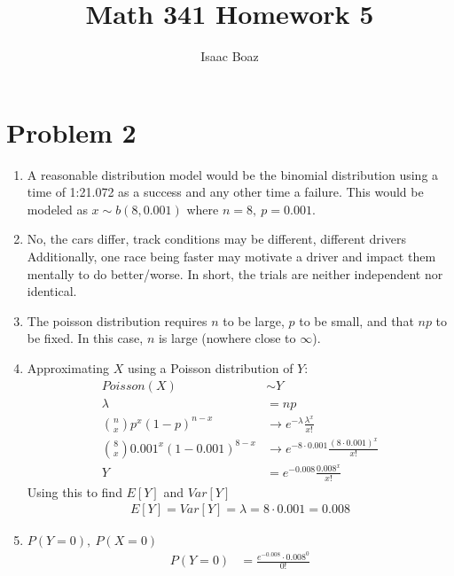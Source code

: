 \documentclass{article}
\title{\vspace{-4ex}Math 341 Homework 5}
\author{Isaac Boaz}
\begin{document}
\maketitle

\section*{Problem 2}
\begin{enumerate}[label=\alph*)]
    \item A reasonable distribution model would be the binomial distribution using a time of 1:21.072 as a success and any other time a failure. This would be modeled as \(x \sim b(8, 0.001)\) where \(n = 8,\ p = 0.001\).
    \item No, the cars differ, track conditions may be different, different drivers
          Additionally, one race being faster may motivate a driver and impact them mentally to do better/worse. In short, the trials are neither independent nor identical.
    \item The poisson distribution requires \(n\) to be large, \(p\) to be small, and that \(np\) to be fixed. In this case, \(n\) is large (nowhere close to \(\infty\)).
    \item Approximating \(X\) using a Poisson distribution of \(Y\):
          \begin{align*}
              Poisson(X)                         & \sim Y                                                 \\
              \lambda                            & = np                                                   \\
              \binom{n}{x}p^x(1-p)^{n-x}         & \rightarrow e^{-\lambda}\frac{\lambda^x}{x!}           \\
              \binom{8}{x}0.001^x(1-0.001)^{8-x} & \rightarrow e^{-8\cdot0.001}\frac{(8\cdot0.001)^x}{x!} \\
              Y                                  & = e^{-0.008} \frac{0.008^x}{x!}
          \end{align*}
          Using this to find \(E[Y]\) and \(Var[Y]\)
          \begin{align*}
              E[Y] = Var[Y] = \lambda = 8\cdot0.001 = 0.008
          \end{align*}
    \item \(P(Y = 0),\ P(X = 0)\) %
          \begin{align*}
              P(Y = 0) & = \frac{e^{-0.008} \cdot 0.008^0}{0!} \\

\end{align*}
\end{enumerate}
\end{document}
